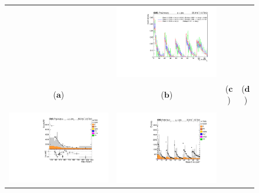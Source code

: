 \begin{figure}[htp]
\begin{tabular}{cccc}
& \hspace{-1.3cm} \includegraphics[scale=0.20]{fig/chapt6/qcd/qcd_e_ch/ttbar_m_cos_3region_compare_eCh.pdf}\\
($\mathbf{a}$)\qquad\qquad&($\mathbf{b}$)\qquad\qquad&($\mathbf{c}$)\qquad\qquad&($\mathbf{d}$)\qquad\qquad\\ \\
\hspace{-0.5cm}
\includegraphics[scale=0.22]{fig/chapt6/qcd/qcd_mu_ch/Mass_H_binned43_Inf.pdf}
& \hspace{-1.0cm} \includegraphics[scale=0.225]{fig/chapt6/qcd/qcd_mu_ch/massH_cos_theta43_Inf.pdf}

\end{tabular}
\end{figure}
